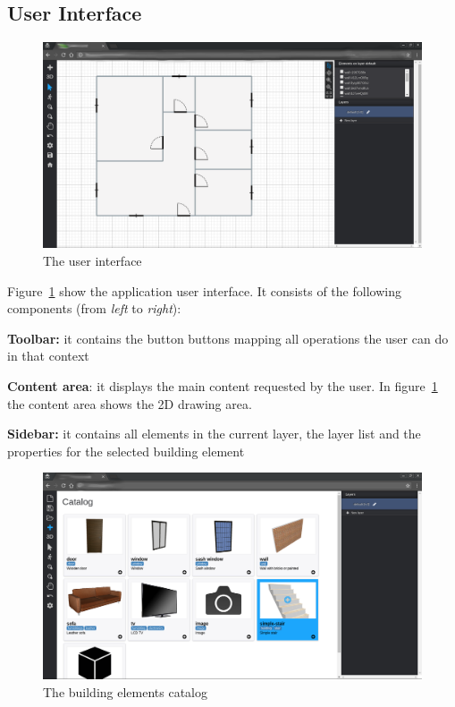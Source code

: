 \subsection{User Interface}\label{ssec:ui}

\begin{figure}[htb]
\centering
\includegraphics[width=\linewidth]{contents/images/fig2d}
\caption{The user interface}
\label{fig2D}
\end{figure}

Figure~\ref{fig2D} show the application user interface. It consists of the following components (from \textit{left} to \textit{right}):

\textbf{Toolbar:} it contains the button buttons mapping all operations the user can do in that context

\textbf{Content area}: it displays the main content requested by the user. In figure~\ref{fig2D} the content area shows the 2D drawing area.

\textbf{Sidebar:} it contains all elements in the current layer, the layer list and the properties for the selected building element\\

\begin{figure}[htb]
\centering
\includegraphics[width=\linewidth]{contents/images/figcatalog}
\caption{The building elements catalog}
\label{figCatalogo}
\end{figure}


